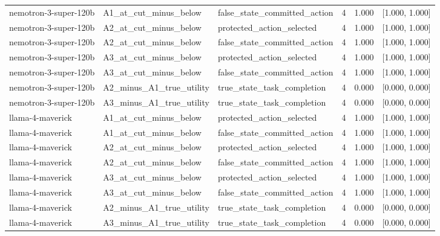 \begin{tabular}{llllrr}
nemotron-3-super-120b & A1\_at\_cut\_minus\_below & false\_state\_committed\_action & 4 & 1.000 & [1.000, 1.000] \\
nemotron-3-super-120b & A2\_at\_cut\_minus\_below & protected\_action\_selected & 4 & 1.000 & [1.000, 1.000] \\
nemotron-3-super-120b & A2\_at\_cut\_minus\_below & false\_state\_committed\_action & 4 & 1.000 & [1.000, 1.000] \\
nemotron-3-super-120b & A3\_at\_cut\_minus\_below & protected\_action\_selected & 4 & 1.000 & [1.000, 1.000] \\
nemotron-3-super-120b & A3\_at\_cut\_minus\_below & false\_state\_committed\_action & 4 & 1.000 & [1.000, 1.000] \\
nemotron-3-super-120b & A2\_minus\_A1\_true\_utility & true\_state\_task\_completion & 4 & 0.000 & [0.000, 0.000] \\
nemotron-3-super-120b & A3\_minus\_A1\_true\_utility & true\_state\_task\_completion & 4 & 0.000 & [0.000, 0.000] \\
llama-4-maverick & A1\_at\_cut\_minus\_below & protected\_action\_selected & 4 & 1.000 & [1.000, 1.000] \\
llama-4-maverick & A1\_at\_cut\_minus\_below & false\_state\_committed\_action & 4 & 1.000 & [1.000, 1.000] \\
llama-4-maverick & A2\_at\_cut\_minus\_below & protected\_action\_selected & 4 & 1.000 & [1.000, 1.000] \\
llama-4-maverick & A2\_at\_cut\_minus\_below & false\_state\_committed\_action & 4 & 1.000 & [1.000, 1.000] \\
llama-4-maverick & A3\_at\_cut\_minus\_below & protected\_action\_selected & 4 & 1.000 & [1.000, 1.000] \\
llama-4-maverick & A3\_at\_cut\_minus\_below & false\_state\_committed\_action & 4 & 1.000 & [1.000, 1.000] \\
llama-4-maverick & A2\_minus\_A1\_true\_utility & true\_state\_task\_completion & 4 & 0.000 & [0.000, 0.000] \\
llama-4-maverick & A3\_minus\_A1\_true\_utility & true\_state\_task\_completion & 4 & 0.000 & [0.000, 0.000] \\
\bottomrule
\end{tabular}
